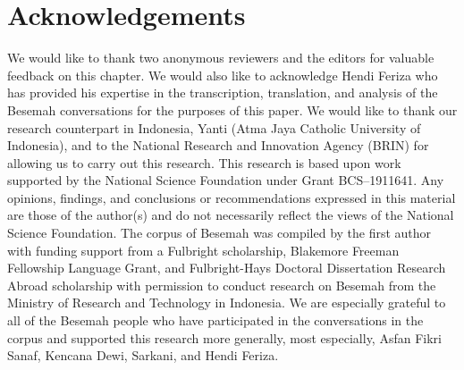 \documentclass[output=paper,
\ChapterDOI{10.5281/zenodo.15697583}
colorlinks,
citecolor=brown]{langscibook}
\begin{document}
\section*{Acknowledgements}
We would like to thank two anonymous reviewers and the editors for valuable feedback on this chapter. We would also like to acknowledge Hendi Feriza who has provided his expertise in the transcription, translation, and analysis of the Besemah conversations for the purposes of this paper. We would like to thank our research counterpart in Indonesia, Yanti (Atma Jaya Catholic University of Indonesia), and to the National Research and Innovation Agency (BRIN) for allowing us to carry out this research. This research is based upon work supported by the National Science Foundation under Grant BCS–1911641. Any opinions, findings, and conclusions or recommendations expressed in this material are those of the author(s) and do not necessarily reflect the views of the National Science Foundation. The corpus of Besemah was compiled by the first author with funding support from a Fulbright scholarship, Blakemore Freeman Fellowship Language Grant, and Fulbright-Hays Doctoral Dissertation Research Abroad scholarship with permission to conduct research on Besemah from the Ministry of Research and Technology in Indonesia. We are especially grateful to all of the Besemah people who have participated in the conversations in the corpus and supported this research more generally, most especially, Asfan Fikri Sanaf, Kencana Dewi, Sarkani, and Hendi Feriza.

\sloppy
\printbibliography[heading=subbibliography,notkeyword=this]
\end{document}
